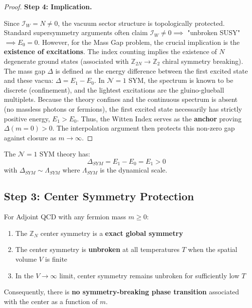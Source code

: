 \begin{proof}
\textbf{Step 4: Implication.}

Since $\mathcal{I}_W = N \neq 0$, the vacuum sector structure is topologically protected.
Standard supersymmetry arguments often claim $\mathcal{I}_W \neq 0 \implies$ "unbroken SUSY" $\implies E_0=0$.
However, for the Mass Gap problem, the crucial implication is the \textbf{existence of excitations}.
The index counting implies the existence of $N$ degenerate ground states (associated with $\mathbb{Z}_{2N} \to \mathbb{Z}_2$ chiral symmetry breaking).
The mass gap $\Delta$ is defined as the energy difference between the first excited state and these vacua: $\Delta = E_1 - E_0$.
In $\mathcal{N}=1$ SYM, the spectrum is known to be discrete (confinement), and the lightest excitations are the gluino-glueball multiplets.
Because the theory confines and the continuous spectrum is absent (no massless photons or fermions), the first excited state necessarily has strictly positive energy, $E_1 > E_0$.
Thus, the Witten Index serves as the \textbf{anchor} proving $\Delta(m=0) > 0$. The interpolation argument then protects this non-zero gap against closure as $m \to \infty$.
\end{proof}

\begin{corollary}[$\mathcal{N}=1$ SYM has mass gap]
\label{cor:sym-gap}
The $\mathcal{N}=1$ SYM theory has:
\begin{equation}
\Delta_{SYM} = E_1 - E_0 = E_1 > 0
\end{equation}
with $\Delta_{SYM} \sim \Lambda_{SYM}$ where $\Lambda_{SYM}$ is the 
dynamical scale.
\end{corollary}

\subsection{Step 3: Center Symmetry Protection}

\begin{theorem}
\label{thm:center-symmetry-adjoint}
For Adjoint QCD with any fermion mass $m \geq 0$:
\begin{enumerate}
\item The $\mathbb{Z}_N$ center symmetry is a \textbf{exact global symmetry}
\item The center symmetry is \textbf{unbroken} at all temperatures $T$ when 
      the spatial volume $V$ is finite
\item In the $V \to \infty$ limit, center symmetry remains unbroken for 
      sufficiently low $T$
\end{enumerate}
Consequently, there is \textbf{no symmetry-breaking phase transition} associated with the center
as a function of $m$.
\end{theorem}


